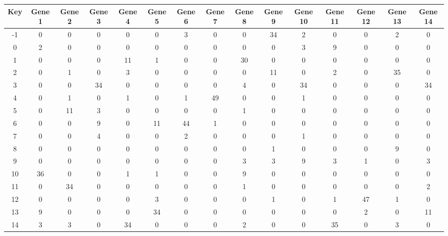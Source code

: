 \begin{tabular}{|c|c|c|c|c|c|c|c|c|c|c|c|c|c|c|}
\hline
Key & Gene 1 & Gene 2 & Gene 3 & Gene 4 & Gene 5 & Gene 6 & Gene 7 & Gene 8 & Gene 9 & Gene 10 & Gene 11 & Gene 12 & Gene 13 & Gene 14 \\
\hline
-1 & 0 & 0 & 0 & 0 & 0 & 3 & 0 & 0 & 34 & 2 & 0 & 0 & 2 & 0 \\
0 & 2 & 0 & 0 & 0 & 0 & 0 & 0 & 0 & 0 & 3 & 9 & 0 & 0 & 0 \\
1 & 0 & 0 & 0 & 11 & 1 & 0 & 0 & 30 & 0 & 0 & 0 & 0 & 0 & 0 \\
2 & 0 & 1 & 0 & 3 & 0 & 0 & 0 & 0 & 11 & 0 & 2 & 0 & 35 & 0 \\
3 & 0 & 0 & 34 & 0 & 0 & 0 & 0 & 4 & 0 & 34 & 0 & 0 & 0 & 34 \\
4 & 0 & 1 & 0 & 1 & 0 & 1 & 49 & 0 & 0 & 1 & 0 & 0 & 0 & 0 \\
5 & 0 & 11 & 3 & 0 & 0 & 0 & 0 & 1 & 0 & 0 & 0 & 0 & 0 & 0 \\
6 & 0 & 0 & 9 & 0 & 11 & 44 & 1 & 0 & 0 & 0 & 0 & 0 & 0 & 0 \\
7 & 0 & 0 & 4 & 0 & 0 & 2 & 0 & 0 & 0 & 1 & 0 & 0 & 0 & 0 \\
8 & 0 & 0 & 0 & 0 & 0 & 0 & 0 & 0 & 1 & 0 & 0 & 0 & 9 & 0 \\
9 & 0 & 0 & 0 & 0 & 0 & 0 & 0 & 3 & 3 & 9 & 3 & 1 & 0 & 3 \\
10 & 36 & 0 & 0 & 1 & 1 & 0 & 0 & 9 & 0 & 0 & 0 & 0 & 0 & 0 \\
11 & 0 & 34 & 0 & 0 & 0 & 0 & 0 & 1 & 0 & 0 & 0 & 0 & 0 & 2 \\
12 & 0 & 0 & 0 & 0 & 3 & 0 & 0 & 0 & 1 & 0 & 1 & 47 & 1 & 0 \\
13 & 9 & 0 & 0 & 0 & 34 & 0 & 0 & 0 & 0 & 0 & 0 & 2 & 0 & 11 \\
14 & 3 & 3 & 0 & 34 & 0 & 0 & 0 & 2 & 0 & 0 & 35 & 0 & 3 & 0 \\
\hline
\end{tabular}